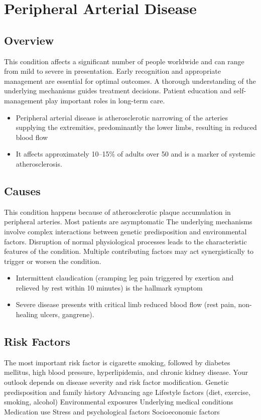 \chapter{Peripheral Arterial Disease}
\label{sec:Peripheral Arterial Disease}

\section{Overview}
This condition affects a significant number of people worldwide and can range from mild to severe in presentation. Early recognition and appropriate management are essential for optimal outcomes. A thorough understanding of the underlying mechanisms guides treatment decisions. Patient education and self-management play important roles in long-term care.

\begin{itemize}[noitemsep]
  \item Peripheral arterial disease is atherosclerotic narrowing of the arteries supplying the extremities, predominantly the lower limbs, resulting in reduced blood flow
  \item It affects approximately 10--15\% of adults over 50 and is a marker of systemic atherosclerosis.
\end{itemize}
\section{Causes}
This condition happens because of atherosclerotic plaque accumulation in peripheral arteries. Most patients are asymptomatic The underlying mechanisms involve complex interactions between genetic predisposition and environmental factors. Disruption of normal physiological processes leads to the characteristic features of the condition. Multiple contributing factors may act synergistically to trigger or worsen the condition.

\begin{itemize}[noitemsep]
  \item Intermittent claudication (cramping leg pain triggered by exertion and relieved by rest within 10 minutes) is the hallmark symptom
  \item Severe disease presents with critical limb reduced blood flow (rest pain, non-healing ulcers, gangrene).
\end{itemize}
\section{Risk Factors}
The most important risk factor is cigarette smoking, followed by diabetes mellitus, high blood pressure, hyperlipidemia, and chronic kidney disease. Your outlook depends on disease severity and risk factor modification. Genetic predisposition and family history Advancing age Lifestyle factors (diet, exercise, smoking, alcohol) Environmental exposures Underlying medical conditions Medication use Stress and psychological factors Socioeconomic factors


